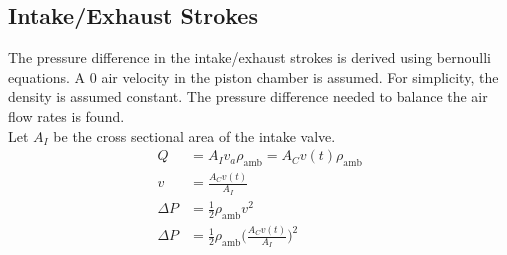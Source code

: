 \documentclass[10pt,a4paper]{article}
\begin{document}
\subsection*{Intake/Exhaust Strokes}
The pressure difference in the intake/exhaust strokes is derived using bernoulli equations. A 0 air velocity in the piston chamber is assumed. For simplicity, the density is assumed constant. The pressure difference needed to balance the air flow rates is found. \\ Let $A_I$ be the cross sectional area of the intake valve.
\begin{align*}
	Q &= A_I v_a \rho_{\text{amb}} = A_C v(t)\rho_{\text{amb}}\\
	v &= \frac{A_C v(t)}{A_I}\\
	\Delta P &= \frac{1}{2} \rho_{\text{amb}} v^2 \\
	\Delta P &= \frac{1}{2} \rho_{\text{amb}} \Big( \frac{A_C v(t)}{A_I} \Big)^2
\end{align*}
\end{document}
